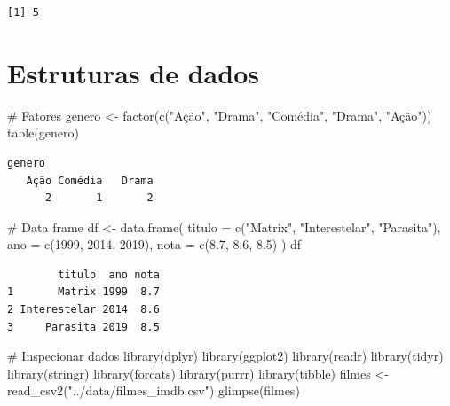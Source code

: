 \documentclass[
  letterpaper,
]{scrbook}
\newenvironment{Shaded}{\begin{snugshade}}{\end{snugshade}}
\newcommand{\AttributeTok}[1]{\textcolor[rgb]{0.40,0.45,0.13}{#1}}
\newcommand{\CommentTok}[1]{\textcolor[rgb]{0.37,0.37,0.37}{#1}}
\newcommand{\DecValTok}[1]{\textcolor[rgb]{0.68,0.00,0.00}{#1}}
\newcommand{\FloatTok}[1]{\textcolor[rgb]{0.68,0.00,0.00}{#1}}
\newcommand{\FunctionTok}[1]{\textcolor[rgb]{0.28,0.35,0.67}{#1}}
\newcommand{\NormalTok}[1]{\textcolor[rgb]{0.00,0.23,0.31}{#1}}
\newcommand{\OtherTok}[1]{\textcolor[rgb]{0.00,0.23,0.31}{#1}}
\newcommand{\StringTok}[1]{\textcolor[rgb]{0.13,0.47,0.30}{#1}}
\begin{document}
\begin{verbatim}
[1] 5
\end{verbatim}

\section*{Estruturas de dados}\label{estruturas-de-dados-1}


\begin{Shaded}
\begin{Highlighting}[]
\CommentTok{\# Fatores}
\NormalTok{genero }\OtherTok{\textless{}{-}} \FunctionTok{factor}\NormalTok{(}\FunctionTok{c}\NormalTok{(}\StringTok{"Ação"}\NormalTok{, }\StringTok{"Drama"}\NormalTok{, }\StringTok{"Comédia"}\NormalTok{, }\StringTok{"Drama"}\NormalTok{, }\StringTok{"Ação"}\NormalTok{))}
\FunctionTok{table}\NormalTok{(genero)}
\end{Highlighting}
\end{Shaded}

\begin{verbatim}
genero
   Ação Comédia   Drama 
      2       1       2 
\end{verbatim}

\begin{Shaded}
\begin{Highlighting}[]
\CommentTok{\# Data frame}
\NormalTok{df }\OtherTok{\textless{}{-}} \FunctionTok{data.frame}\NormalTok{(}
  \AttributeTok{titulo =} \FunctionTok{c}\NormalTok{(}\StringTok{"Matrix"}\NormalTok{, }\StringTok{"Interestelar"}\NormalTok{, }\StringTok{"Parasita"}\NormalTok{),}
  \AttributeTok{ano =} \FunctionTok{c}\NormalTok{(}\DecValTok{1999}\NormalTok{, }\DecValTok{2014}\NormalTok{, }\DecValTok{2019}\NormalTok{),}
  \AttributeTok{nota =} \FunctionTok{c}\NormalTok{(}\FloatTok{8.7}\NormalTok{, }\FloatTok{8.6}\NormalTok{, }\FloatTok{8.5}\NormalTok{)}
\NormalTok{)}
\NormalTok{df}
\end{Highlighting}
\end{Shaded}

\begin{verbatim}
        titulo  ano nota
1       Matrix 1999  8.7
2 Interestelar 2014  8.6
3     Parasita 2019  8.5
\end{verbatim}

\begin{Shaded}
\begin{Highlighting}[]
\CommentTok{\# Inspecionar dados}
\FunctionTok{library}\NormalTok{(dplyr)}
\FunctionTok{library}\NormalTok{(ggplot2)}
\FunctionTok{library}\NormalTok{(readr)}
\FunctionTok{library}\NormalTok{(tidyr)}
\FunctionTok{library}\NormalTok{(stringr)}
\FunctionTok{library}\NormalTok{(forcats)}
\FunctionTok{library}\NormalTok{(purrr)}
\FunctionTok{library}\NormalTok{(tibble)}
\NormalTok{filmes }\OtherTok{\textless{}{-}} \FunctionTok{read\_csv2}\NormalTok{(}\StringTok{"../data/filmes\_imdb.csv"}\NormalTok{)}
\FunctionTok{glimpse}\NormalTok{(filmes)}
\end{Highlighting}
\end{Shaded}
\end{document}
